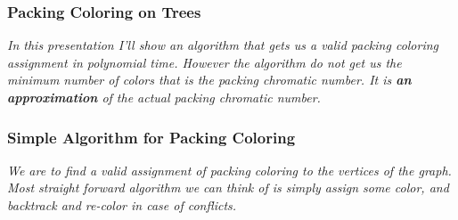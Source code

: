 \begin{frame}
    \frametitle{Packing Coloring on Trees}

    \textit{In this presentation I'll show an algorithm that gets us a valid packing coloring assignment in polynomial time. \pause However the algorithm do not get us the minimum number of colors that is the packing chromatic number. It is \textbf{an approximation} of the actual packing chromatic number.}

\end{frame}

\begin{frame}
    \frametitle{Simple Algorithm for Packing Coloring}

    \textit{We are to find a valid assignment of packing coloring to the vertices of the graph. \pause Most straight forward algorithm we can think of is simply assign some color, and backtrack and re-color in case of conflicts.}

\end{frame}